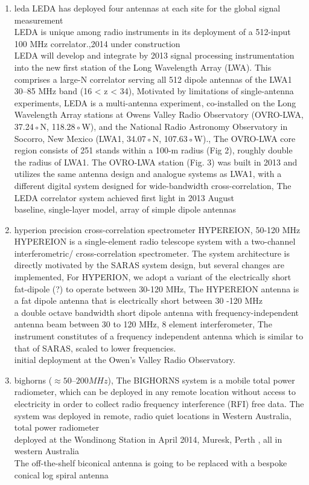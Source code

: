 \documentclass[12pt, TexShade, letterpaper]{report}
\begin{document}
\begin{enumerate}
\item \gls{leda}
LEDA has deployed four antennas at each site for the global signal measurement \cite{leda_foreground}\\
LEDA is unique among radio instruments in its deployment of a 512-input 100 MHz correlator.,2014 under construction \cite{leda_1}\\
LEDA will develop and integrate by 2013 signal processing instrumentation into the new first station of the Long Wavelength Array (LWA). This comprises a large-N correlator serving all 512 dipole antennas of the LWA1 \cite{leda_2}\\
30–85 MHz band (16 < z < 34), Motivated by limitations of single-antenna experiments, LEDA is a multi-antenna experiment, co-installed on the Long Wavelength Array stations at Owens Valley Radio Observatory (OVRO-LWA, 37.24◦N, 118.28◦W), and the National Radio Astronomy Observatory in Socorro, New Mexico (LWA1, 34.07◦N, 107.63◦W)., The OVRO-LWA core region consists of 251 stands within a 100-m radius (Fig 2), roughly double the radius of LWA1. The OVRO-LWA station (Fig. 3) was built in 2013 and utilizes the same antenna design and analogue systems as LWA1, with a different digital system designed for wide-bandwidth cross-correlation, The LEDA correlator system achieved first light in 2013 August \cite{leda_design}\\
baseline, single-layer model, array of simple dipole antennas\cite{leda_beam}

\item \gls{hyperion}
precision cross-correlation spectrometer HYPEREION, 50-120 MHz
HYPEREION is a single-element radio telescope system with a two-channel interferometric/ cross-correlation spectrometer. The system architecture is directly motivated by the SARAS system design, but several changes are implemented, For HYPERION, we adopt a variant of the electrically short fat-dipole (?) to operate between 30-120 MHz, The HYPEREION antenna is a fat dipole antenna that is electrically short between 30 -120 MHz \cite{hyperion_1}\\
a double octave bandwidth short dipole antenna with frequency-independent antenna beam between 30 to 120 MHz, 8 element interferometer, The instrument constitutes of a frequency independent antenna which is similar to that of SARAS, scaled to lower frequencies. \cite{hyperion_2}\\
initial deployment at the Owen’s Valley Radio Observatory. \cite{hyperion_3}
\item \gls{bighorns}
($\approx 50–200 MHz$), The BIGHORNS system is a mobile total power radiometer, which can be deployed in any remote location without access to electricity in order to collect radio frequency interference (RFI) free data. The system was deployed in remote, radio quiet locations in Western Australia, total power radiometer \\
deployed at the Wondinong Station in April 2014, Muresk, Perth , all in western Australia \\
The off-the-shelf biconical antenna is going to be replaced with a bespoke conical log spiral antenna \cite{bighorns_1}
\end{enumerate}
\end{document}
